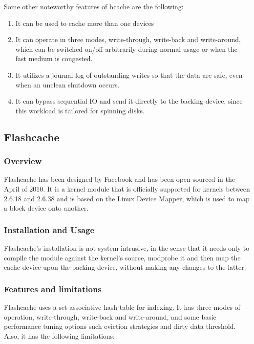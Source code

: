 Some other noteworthy features of bcache are the following:

\begin{enumerate}
	\item It can be used to cache more than one devices
	\item It can operate in three modes, write-through, write-back and 
		write-around, which can be switched on/off arbitrarily during normal 
		usage or when the fast medium is congested.
	\item It utilizes a journal log of outstanding writes so that the data are 
		safe, even when an unclean shutdown occurs.
	\item It can bypass sequential IO and send it directly to the backing 
		device, since this workload is tailored for spinning disks.
\end{enumerate}

\subsection{Flashcache}

\subsubsection{Overview}

Flashcache has been designed by Facebook and has been open-sourced in the April 
of 2010. It is a kernel module that is officially supported for kernels between  
2.6.18 and 2.6.38 and is based on the Linux Device Mapper, which is used to map 
a block device onto another.

\subsubsection{Installation and Usage}

Flashcache's installation is not system-intrusive, in the sense that it needs 
only to compile the module against the kernel's source, modprobe it and then 
map the cache device upon the backing device, without making any changes to the 
latter.

\subsubsection{Features and limitations}

Flashcache uses a set-associative hash table for indexing. It has three modes 
of operation, write-through, write-back and write-around, and some basic 
performance tuning options such eviction strategies and dirty data threshold.  
Also, it has the following limitations:

